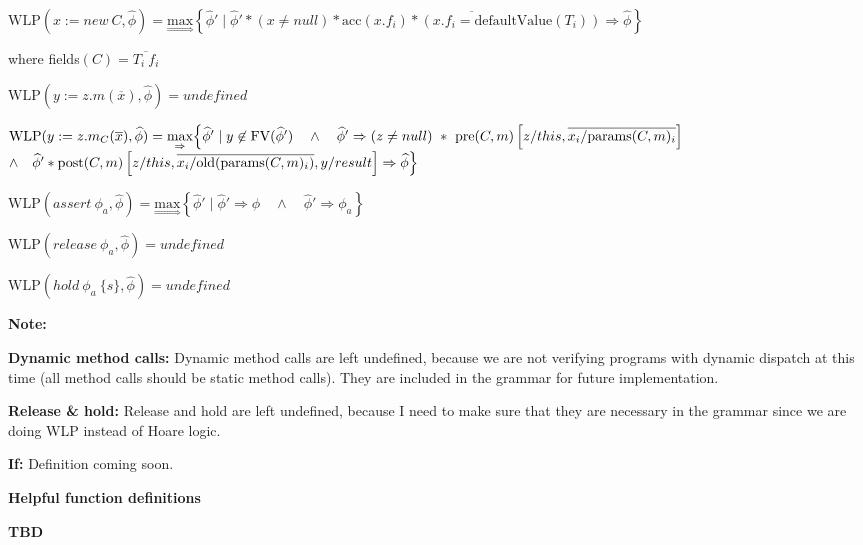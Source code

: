 \documentclass {article}
\newcommand{\fphi}{\widehat{\phi}}
\newcommand{\acc}[1]{\text{acc}(#1)}
\newcommand{\imp}{\Rightarrow}
\newcommand{\maximp}[2]{\underset{\Rightarrow}{\text{max}}\left\{#1 \mid #2\right\}}
\newcommand{\wlp}[2]{\text{WLP}(#1,#2)}
\begin{document}
\vspace{0.5cm}

$\wlp{x := new\ C}{\fphi} = \maximp{\fphi'}{ \fphi' \ast (x \neq null) \ast \overline{\acc{x.f_i} \ast (x.f_i = \text{defaultValue}(T_i))} \imp \fphi}$ 

\indent  \hspace{4cm} where fields$(C) = \overline{T_i \ f_i}$

\vspace{0.5cm}

$\wlp{y := z.m(\overline{x})}{\fphi} = undefined$

\vspace{0.5cm}

$\wlp{y := z.m_C(\overline{x})}{\fphi} = \underset{\Rightarrow}{\text{max}} \Big{\{} \fphi' \mid y \not \in \text{FV}(\fphi') \quad \wedge \quad \fphi' \imp (z \neq null) \ \ast \ \text{pre}(C,m)\left[z/this, \overline{x_i/\text{params}(C,m)_i}\right] $ 
\indent \hspace{4cm} $ \wedge \quad \fphi' \ast \text{post}(C,m)\left[z/this, \overline{x_i/\text{old}(\text{params}(C,m)_i)}, y/result \right] \imp \fphi \Big{\}}$

\vspace{0.5cm}

$\wlp{assert\ \phi_a}{\fphi} = \maximp{\fphi'}{\fphi' \imp \fphi \quad \wedge \quad \fphi' \imp \phi_a} $

\vspace{0.5cm}

$\wlp{release \ \phi_a}{\fphi} = undefined $

\vspace{0.5cm}

$\wlp{hold \ \phi_a \ \{s\}}{\fphi} = undefined $

\vspace{0.5cm}

\noindent \textbf{Note:} 

\textbf{Dynamic method calls:} Dynamic method calls are left undefined, because we are not verifying programs with dynamic dispatch at this time (all method calls should be static method calls). They are included in the grammar for future implementation.

\textbf{Release \& hold:} Release and hold are left undefined, because I need to make sure that they are necessary in the grammar since we are doing WLP instead of Hoare logic.

\textbf{If:} Definition coming soon.

\begin{center}
\textbf{Helpful function definitions}
\end{center}

\textbf{TBD}
\end{document}
